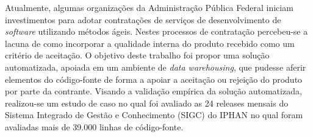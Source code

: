 \begin{resumo}

Atualmente, algumas organizações da Administração Pública Federal iniciam investimentos para adotar contratações de serviços de desenvolvimento de \textit{software} utilizando métodos ágeis. Nestes processos de contratação percebeu-se a lacuna de como incorporar a qualidade interna do produto recebido como um critério de aceitação. O objetivo deste trabalho foi propor uma solução automatizada, apoiada em um ambiente de \textit{data warehousing}, que pudesse aferir elementos do código-fonte de forma a apoiar a aceitação ou rejeição do produto por parte da contrante. Visando a validação empírica da solução automatizada, realizou-se um estudo de caso no qual foi avaliado as 24 releases mensais do Sistema Integrado de Gestão e Conhecimento (SIGC) do IPHAN no qual foram avaliadas mais de 39.000 linhas de código-fonte. 

\end{resumo}
